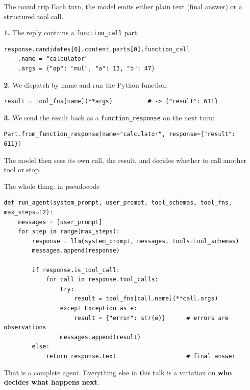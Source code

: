 \documentclass[aspectratio=169,10pt]{beamer}
\newcommand{\code}[1]{\texttt{\small #1}}
\newcommand{\hl}[1]{\textcolor{accent}{\textbf{#1}}}
\begin{document}
\begin{frame}[fragile]{The round trip}
Each turn, the model emits either plain text (final answer) or a structured tool call.

\vspace{0.5em}
\textbf{1.} The reply contains a \code{function\_call} part:
\begin{lstlisting}
response.candidates[0].content.parts[0].function_call
    .name = "calculator"
    .args = {"op": "mul", "a": 13, "b": 47}
\end{lstlisting}

\textbf{2.} We dispatch by name and run the Python function:
\begin{lstlisting}
result = tool_fns[name](**args)          # -> {"result": 611}
\end{lstlisting}

\textbf{3.} We send the result back as a \code{function\_response} on the next turn:
\begin{lstlisting}
Part.from_function_response(name="calculator", response={"result": 611})
\end{lstlisting}

\vspace{0.3em}
The model then sees its own call, the result, and decides whether to call
another tool or stop.
\end{frame}

\begin{frame}[fragile]{The whole thing, in pseudocode}
\begin{lstlisting}
def run_agent(system_prompt, user_prompt, tool_schemas, tool_fns, max_steps=12):
    messages = [user_prompt]
    for step in range(max_steps):
        response = llm(system_prompt, messages, tools=tool_schemas)
        messages.append(response)

        if response.is_tool_call:
            for call in response.tool_calls:
                try:
                    result = tool_fns[call.name](**call.args)
                except Exception as e:
                    result = {"error": str(e)}      # errors are observations
                messages.append(result)
        else:
            return response.text                    # final answer
\end{lstlisting}

\vspace{0.5em}
That is a complete agent. Everything else in this talk is a variation on
\hl{who decides what happens next}.
\end{frame}
\end{document}
